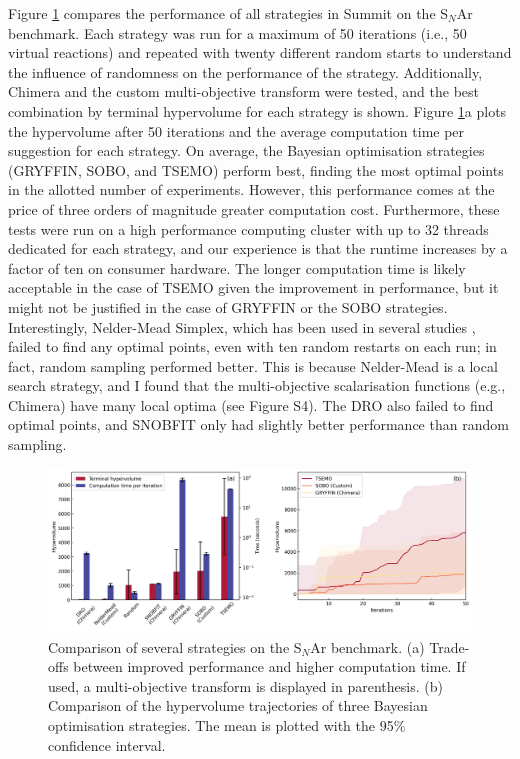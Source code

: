 Figure \ref{fig:hv_time_tradeoff} compares the performance of all strategies in Summit on the S$_N$Ar benchmark. Each strategy was run for a maximum of 50 iterations (i.e., 50 virtual reactions) and repeated with twenty different random starts to understand the influence of randomness on the performance of the strategy. Additionally, Chimera and the custom multi-objective transform were tested, and the best combination by terminal hypervolume for each strategy is shown. Figure \ref{fig:hv_time_tradeoff}a plots the hypervolume after 50 iterations and the average computation time per suggestion for each strategy. On average, the Bayesian optimisation strategies (GRYFFIN, SOBO, and TSEMO) perform best, finding the most optimal points in the allotted number of experiments. However, this performance comes at the price of three orders of magnitude greater computation cost. Furthermore, these tests were run on a high performance computing cluster with up to 32 threads dedicated for each strategy, and our experience is that the runtime increases by a factor of ten on consumer hardware.  The longer computation time is likely acceptable in the case of TSEMO given the improvement in performance, but it might not be justified in the case of GRYFFIN or the SOBO strategies.  Interestingly, Nelder-Mead Simplex, which has been used in several studies \cite{McMullen2010b, Parrott2011, Sans2015, CortesBorda2016, Fitzpatrick2016, McMullen2010a, Poscharny2018}, failed to find any optimal points, even with ten random restarts on each run; in fact, random sampling performed better. This is because Nelder-Mead is a local search strategy, and I found that the multi-objective scalarisation functions (e.g., Chimera) have many local optima (see Figure S4). The DRO also failed to find optimal points, and SNOBFIT only had slightly better performance than random sampling.

\begin{figure}
    \centering
    \includegraphics[width=1.2\textwidth]{gfx/Chapter03/snar_hv_time_tradeoff.png}
    \caption{Comparison of several strategies on the S$_N$Ar benchmark. (a) Trade-offs between improved performance and higher computation time. If used, a multi-objective transform is displayed in parenthesis. (b) Comparison of the hypervolume trajectories of three Bayesian optimisation strategies. The mean is plotted with the 95\% confidence interval.}
    \label{fig:hv_time_tradeoff}
\end{figure}

